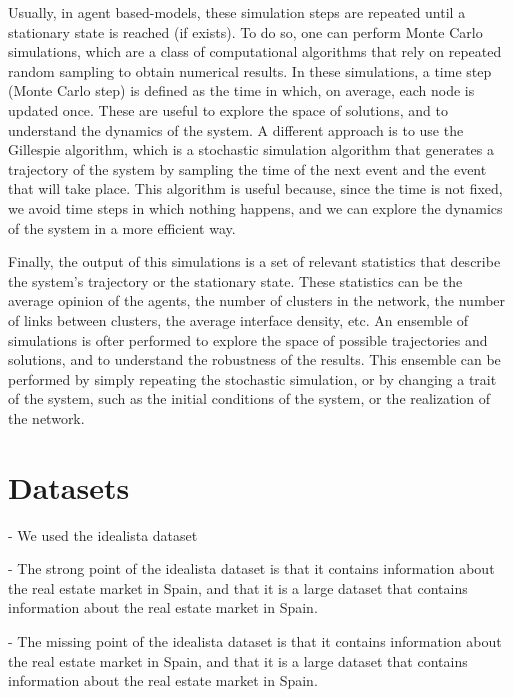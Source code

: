 Usually, in agent based-models, these simulation steps are repeated until a stationary state is reached (if exists). To do so, one can perform Monte Carlo simulations, which are a class of computational algorithms that rely on repeated random sampling to obtain numerical results. In these simulations, a time step (Monte Carlo step) is defined as the time in which, on average, each node is updated once. These are useful to explore the space of solutions, and to understand the dynamics of the system. A different approach is to use the Gillespie algorithm, which is a stochastic simulation algorithm that generates a trajectory of the system by sampling the time of the next event and the event that will take place. This algorithm is useful because, since the time is not fixed, we avoid time steps in which nothing happens, and we can explore the dynamics of the system in a more efficient way.

Finally, the output of this simulations is a set of relevant statistics that describe the system's trajectory or the stationary state. These statistics can be the average opinion of the agents, the number of clusters in the network, the number of links between clusters, the average interface density, etc. An ensemble of simulations is ofter performed to explore the space of possible trajectories and solutions, and to understand the robustness of the results. This ensemble can be performed by simply repeating the stochastic simulation, or by changing a trait of the system, such as the initial conditions of the system, or the realization of the network.

\section{\label{sec:Datasets} Datasets}

- We used the idealista dataset

- The strong point of the idealista dataset is that it contains information about the real estate market in Spain, and that it is a large dataset that contains information about the real estate market in Spain.

- The missing point of the idealista dataset is that it contains information about the real estate market in Spain, and that it is a large dataset that contains information about the real estate market in Spain.

